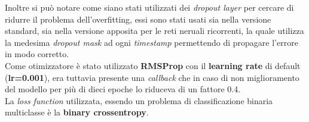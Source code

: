 Inoltre si può notare come siano stati utilizzati dei \textit{dropout layer} per cercare di ridurre il problema dell'overfitting, essi sono stati usati sia nella versione standard, sia nella versione apposita per le reti neruali ricorrenti, la quale utilizza la medesima \textit{dropout mask} ad ogni \textit{timestamp} permettendo di propagare l'errore in modo corretto. \cite{DeepLearningPython}
\\Come otimizzatore è stato utilizzato \textbf{RMSProp} con il \textbf{learning rate} di default (\textbf{lr=0.001}), era tuttavia presente una \textit{callback} che in caso di non miglioramento del modello per più di dieci epoche lo riduceva di un fattore 0.4.
\\La \textit{loss function} utilizzata, essendo un problema di classificazione binaria multiclasse è la \textbf{binary crossentropy}.